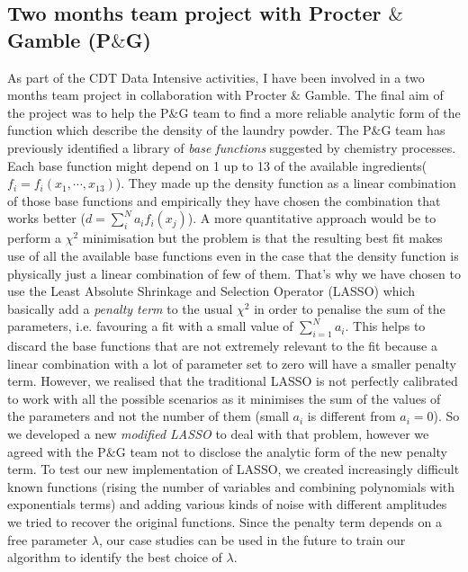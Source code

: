\documentclass[letterpaper]{article}
\newcommand{\peg}{P$\&$G }
\begin{document}
\subsection{Two months team project with Procter $\&$ Gamble (P$\&$G)}
\label{sub:peg}

As part of the CDT Data Intensive activities, I have been involved in a two months team project in collaboration with Procter $\&$ Gamble. The final aim of the project was to help the P$\&$G team to find a more reliable analytic form of the function which describe the density of the laundry powder. The \peg team has previously identified a library of \textit{base functions} suggested by chemistry processes. Each base function might depend on 1 up to 13 of the available ingredients($f_i = f_i(x_1, \cdots, x_{13})$). They made up the density function as a linear combination of those base functions and empirically they have chosen the combination that works better ($d = \sum_i^N a_i f_i(x_j)$). A more quantitative approach would be to perform a $\chi^2$ minimisation but the problem is that the resulting best fit makes use of all the available base functions even in the case that the density function is physically just a linear combination of few of them. That's why we have chosen to use the Least Absolute Shrinkage and Selection Operator (LASSO) which basically add a \textit{penalty term} to the usual $\chi^2$ in order to penalise the sum of the parameters, i.e. favouring a fit with a small value of $\sum_{i=1}^N a_i$. This helps to discard the base functions that are not extremely relevant to the fit because a linear combination with a lot of parameter set to zero will have a smaller penalty term. However, we realised that the traditional LASSO is not perfectly calibrated to work with all the possible scenarios as it minimises the sum of the values of the parameters and not the number of them (small $a_i$ is different from $a_i=0$). So we developed a new \textit{modified LASSO} to deal with that problem, however we agreed with the \peg team not to disclose the analytic form of the new penalty term. To test our new implementation of LASSO, we created increasingly difficult known functions (rising the number of variables and combining polynomials with exponentials terms) and adding various kinds of noise with different amplitudes we tried to recover the original functions. Since the penalty term depends on a free parameter $\lambda$, our case studies can be used in the future to train our algorithm to identify the best choice of $\lambda$.
\end{document}
